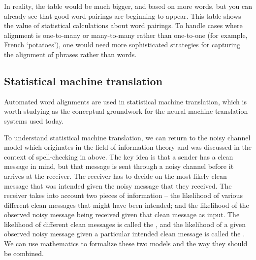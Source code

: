 In reality, the table would be much bigger, and based on more words,
but you can already see that good word pairings are beginning to
appear. This table shows the value of
statistical calculations about word pairings.  To handle cases where alignment is one-to-many or many-to-many rather than one-to-one (for example, French  `potatoes'), one would need more sophisticated strategies for capturing the alignment of phrases rather than words. 


\subsection{Statistical machine translation}

Automated word alignments are used in statistical machine translation, which is worth studying as the conceptual groundwork for the neural machine translation systems used today.




To understand statistical machine translation, we can return to the noisy channel model which originates in the field of information theory and was discussed in the context of spell-checking in  above.  The key idea is that a sender has a clean message in mind, but that message is sent through a noisy channel before it arrives at the receiver.  The receiver has to decide on the most likely  clean message that was intended given the noisy message that they received.   The receiver takes into account two pieces of information -- the likelihood of various different clean messages that might have been intended; and the likelihood of the observed noisy message being received given that clean message as input.  The likelihood of different clean messages is called the , and the likelihood of a given observed noisy message given a particular intended clean message is called the .  We can use mathematics to formalize these two models and the way they should be combined.

